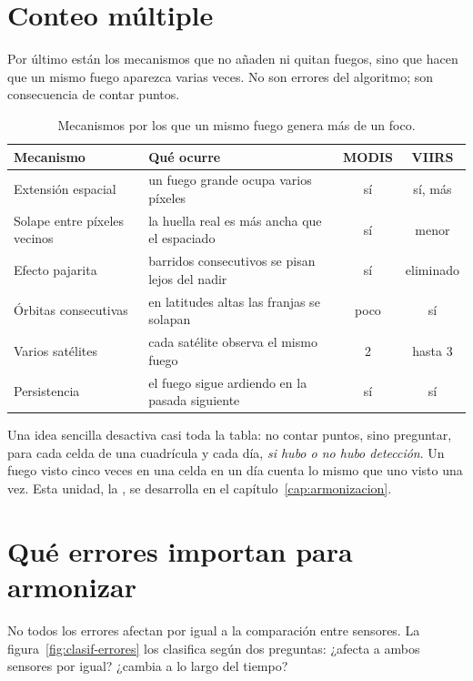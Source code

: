 \section{Conteo múltiple}

Por último están los mecanismos que no añaden ni quitan fuegos, sino que hacen que un mismo
fuego aparezca varias veces. No son errores del algoritmo; son consecuencia de contar puntos.

\begin{table}[ht]
\centering
\renewcommand{\arraystretch}{1.2}
\begin{tabularx}{\textwidth}{>{\raggedright\arraybackslash}p{4.4cm}>{\raggedright\arraybackslash}Xcc}
\toprule
Mecanismo & Qué ocurre & MODIS & VIIRS \\
\midrule
Extensión espacial & un fuego grande ocupa varios píxeles & sí & sí, más \\
Solape entre píxeles vecinos & la huella real es más ancha que el espaciado & sí & menor \\
Efecto pajarita & barridos consecutivos se pisan lejos del nadir & sí & eliminado \\
Órbitas consecutivas & en latitudes altas las franjas se solapan & poco & sí \\
Varios satélites & cada satélite observa el mismo fuego & 2 & hasta 3 \\
Persistencia & el fuego sigue ardiendo en la pasada siguiente & sí & sí \\
\bottomrule
\end{tabularx}
\caption{Mecanismos por los que un mismo fuego genera más de un foco.}
\label{tab:multiple}
\end{table}

Una idea sencilla desactiva casi toda la tabla: no contar puntos, sino preguntar, para cada
celda de una cuadrícula y cada día, \emph{si hubo o no hubo detección}. Un fuego visto cinco
veces en una celda en un día cuenta lo mismo que uno visto una vez. Esta unidad, la
, se desarrolla en el capítulo~\ref{cap:armonizacion}.

\section{Qué errores importan para armonizar}

No todos los errores afectan por igual a la comparación entre sensores. La
figura~\ref{fig:clasif-errores} los clasifica según dos preguntas: ¿afecta a ambos sensores por
igual? ¿cambia a lo largo del tiempo?

